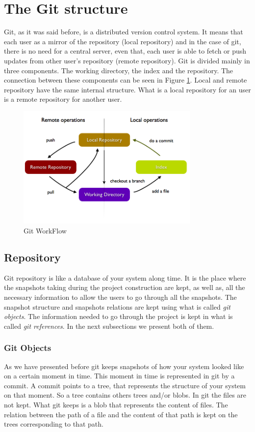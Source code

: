 \section{The Git structure}
Git, as it was said before, is a distributed version control system.
It means that each user as a mirror of the repository (local
repository) and in the case of
git, there is no need for a central server, even that, each user is able to
fetch or push updates from other user's repository (remote repository).
Git is divided mainly in three components. The working directory,
the index and the repository. The connection between these components
can be seen in Figure \ref{fig:git_structure}. Local and remote
repository have the same internal structure. What is a local
repository for an user is a remote repository for another user.

\begin{figure}[h!]
   \centering
   \includegraphics[width=0.8\textwidth]{images/data_flow_simplified.png}
   \caption{Git WorkFlow}\label{fig:git_structure}
\end{figure}

\subsection{Repository}
Git repository is like a database of your system along time. It is
the place where the snapshots taking during the project construction
are kept, as well as, all the necessary information to
allow the users to go through all the snapshots. The snapshot
structure and snapshots relations are kept using what is called \emph{git
objects}. The information needed to go through the project is kept in
what is called \emph{git references}. In the next subsections we
present both of them.

\subsubsection{Git Objects}
As we have presented before git keeps snapshots of how your system
looked like on a certain moment in time. This moment in time is
represented in git by a commit. A commit points to a tree, that
represents the structure of your system on that moment. So a tree
contains others trees and/or blobs. In git the files are not kept. 
What git keeps is a blob that represents the content of files. The
relation between the path of a file and the content of that path 
is kept on the trees corresponding to that path. \par


